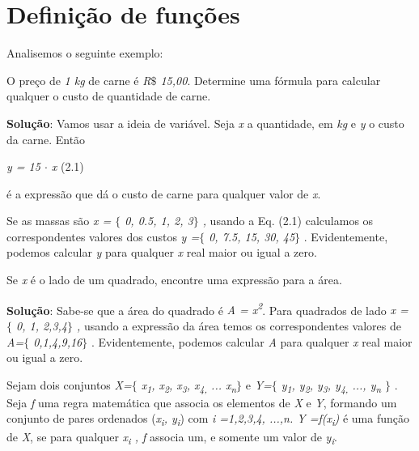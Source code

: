 \section{Definição de funções}

Analisemos o seguinte exemplo:

\begin{texemplo}
O preço de \textit{1 kg} de carne é \textit{R$\$$  15,00}. Determine uma fórmula para calcular qualquer o custo de quantidade de carne.

\textbf{Solução}: Vamos usar a ideia de variável. Seja \textit{x} a quantidade, em \textit{kg} e \textit{y} o custo da carne. Então

\textit{y = 15 $ \cdot $  x } \tab (2.1)
\end{texemplo}

é a expressão que dá o custo de carne para qualquer valor de \textit{x}. 

Se as massas são \textit{x = $ \{ $ 0, 0.5, 1, 2, 3$ \} $ ,} usando a Eq. (2.1) calculamos os correspondentes valores dos custos \textit{y =$ \{ $ 0, 7.5, 15, 30, 45$ \} $ }. Evidentemente, podemos calcular \textit{y} para qualquer \textit{x} real maior ou igual a zero.

\begin{texemplo}
Se \textit{x} é o lado de um quadrado, encontre uma expressão para a área.

\textbf{Solução}: Sabe-se que a área do quadrado é \textit{A = x\textsuperscript{2}}.  Para quadrados de lado \textit{x = $ \{ $ 0, 1, 2,3,4$ \} $ ,} usando a expressão da área temos os correspondentes valores de \textit{A=$ \{ $ 0,1,4,9,16$ \} $ }. Evidentemente, podemos calcular \textit{A} para qualquer  \textit{x} real maior ou igual a zero.
\end{texemplo}

\begin{caixa}
\begin{tdefinicao}
Sejam dois conjuntos \textit{X=$ \{ $ x\textsubscript{1}, x\textsubscript{2}, x\textsubscript{3}, x\textsubscript{4, }... x\textsubscript{n}$ \} $ }  e   \textit{Y=$ \{ $ y\textsubscript{1}, y\textsubscript{2}, y\textsubscript{3}, y\textsubscript{4, }..., y\textsubscript{n} $ \} $ }. Seja \textit{f  }uma regra matemática que associa os elementos de \textit{X} e \textit{Y}, formando um  conjunto de pares ordenados (\textit{x\textsubscript{i}, y\textsubscript{i}}) com \textit{i =1,2,3,4, ...,n. Y =f(x\textsubscript{i})} é uma função de \textit{X}, se para qualquer \textit{ x\textsubscript{i }, f}  associa um, e somente um valor de\textit{ y\textsubscript{i}}. 
\end{tdefinicao}
\end{caixa}

